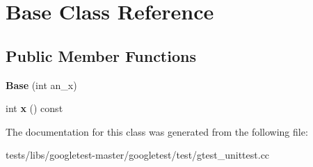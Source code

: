 \hypertarget{classBase}{}\section{Base Class Reference}
\label{classBase}
\subsection*{Public Member Functions}
\begin{DoxyCompactItemize}
\item 
\mbox{\label{classBase_a1d5f3fb92f8cbc687705785bdc6abd18}} 
{\bfseries Base} (int an\+\_\+x)
\item 
\mbox{\label{classBase_a779fd2b157ebd763b15383d96047e07c}} 
int {\bfseries x} () const
\end{DoxyCompactItemize}


The documentation for this class was generated from the following file\+:\begin{DoxyCompactItemize}
\item 
tests/libs/googletest-\/master/googletest/test/gtest\+\_\+unittest.\+cc\end{DoxyCompactItemize}
